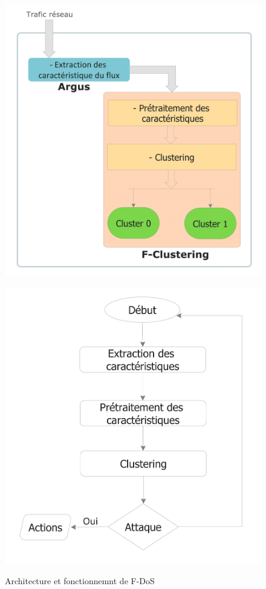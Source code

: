\begin{figure}[h]
\centering
\begin{minipage}[b]{.5\textwidth}
\includegraphics[width=\textwidth]{Figures/F-DoS}
\label{fig:rDoS}
\end{minipage}
\begin{minipage}[b]{.45\textwidth}
\includegraphics[width=\textwidth]{Figures/Diagramme}
\label{fig:rDoS}
\end{minipage}
\decoRule
\caption{Architecture et fonctionnemnt de F-DoS}
\end{figure}

